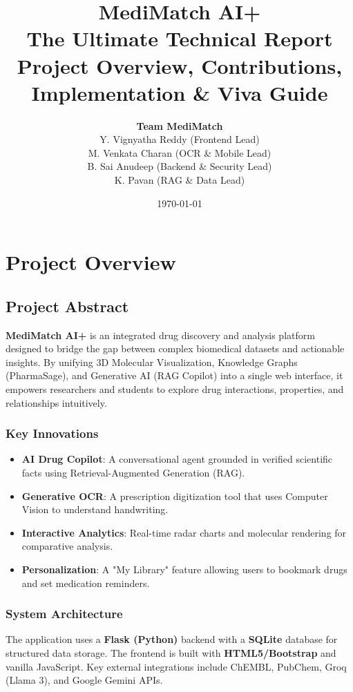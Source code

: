 \documentclass[a4paper,12pt]{report}
\title{
    \textbf{\Huge MediMatch AI+} \\ 
    \LARGE The Ultimate Technical Report \\
    \vspace{0.5cm}
    \large Project Overview, Contributions, Implementation \& Viva Guide
}
\author{
    \textbf{Team MediMatch} \\
    Y. Vignyatha Reddy (Frontend Lead) \\
    M. Venkata Charan (OCR \& Mobile Lead) \\
    B. Sai Anudeep (Backend \& Security Lead) \\
    K. Pavan (RAG \& Data Lead)
}
\date{\today}
\begin{document}
\maketitle
\tableofcontents
\newpage

\part{Project Overview}

\chapter{Project Abstract}
\textbf{MediMatch AI+} is an integrated drug discovery and analysis platform designed to bridge the gap between complex biomedical datasets and actionable insights. By unifying 3D Molecular Visualization, Knowledge Graphs (PharmaSage), and Generative AI (RAG Copilot) into a single web interface, it empowers researchers and students to explore drug interactions, properties, and relationships intuitively.

\section{Key Innovations}
\begin{itemize}
    \item \textbf{AI Drug Copilot}: A conversational agent grounded in verified scientific facts using Retrieval-Augmented Generation (RAG).
    \item \textbf{Generative OCR}: A prescription digitization tool that uses Computer Vision to understand handwriting.
    \item \textbf{Interactive Analytics}: Real-time radar charts and molecular rendering for comparative analysis.
    \item \textbf{Personalization}: A "My Library" feature allowing users to bookmark drugs and set medication reminders.
\end{itemize}

\section{System Architecture}
The application uses a \textbf{Flask (Python)} backend with a \textbf{SQLite} database for structured data storage. The frontend is built with \textbf{HTML5/Bootstrap} and vanilla JavaScript. Key external integrations include ChEMBL, PubChem, Groq (Llama 3), and Google Gemini APIs.
\end{document}
